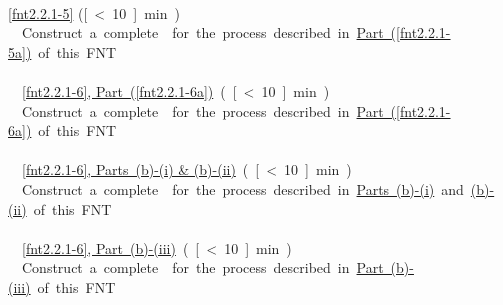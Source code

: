 \noindent{}\\

\noindent\ref{fnt2.2.1-5} (\unit[\textless 10]{min})\\

\noindent Construct a complete \EnergyDiagram{} for the process described in \hyperref[fnt2.2.1-5a]{Part~(\ref*{fnt2.2.1-5a})} of this FNT.\\


\noindent{}\\

\noindent\hyperref[fnt2.2.1-6a]{\ref*{fnt2.2.1-6}, Part~(\ref*{fnt2.2.1-6a})} 	(\unit[\textless 10]{min})\\

\noindent Construct a complete \EnergyDiagram{} for the process described in \hyperref[fnt2.2.1-6a]{Part~(\ref*{fnt2.2.1-6a})} of this FNT.\\


\noindent{}\\

\noindent\hyperref[fnt2.2.1-6b1]{\ref*{fnt2.2.1-6}, Parts~(b)-(i) \& (b)-(ii)} (\unit[\textless 10]{min})\\

\noindent Construct a complete \EnergyDiagram{} for the process described in \hyperref[fnt2.2.1-6b1]{Parts~(b)-(i)} and \hyperref[fnt2.2.1-6b2]{(b)-(ii)} of this FNT.\\


\noindent{}\\

\noindent\hyperref[fnt2.2.1-6b3]{\ref*{fnt2.2.1-6}, Part~(b)-(iii)} (\unit[\textless 10]{min})\\

\noindent Construct a complete \EnergyDiagram{} for the process described in \hyperref[fnt2.2.1-6b3]{Part~(b)-(iii)} of this FNT.\\

\WCD